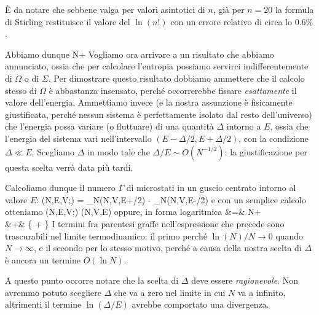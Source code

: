 \begin{Nota}
\`E da notare che sebbene valga per valori asintotici di $n$, già per $n=20$ la formula di Stirling restituisce il valore del $\ln(n!)$ con un errore relativo di circa lo $0.6\%$.
\end{Nota}

Abbiamo dunque
\be
\ln{} \simeq N\ln{} + 
\ee
Vogliamo ora arrivare a un risultato che abbiamo annunciato, ossia che per calcolare l'entropia possiamo servirci indifferentemente di $\Omega$ o di $\Sigma$. Per dimostrare questo risultato dobbiamo ammettere che il calcolo stesso di $\Omega$ è abbastanza insensato, perché occorrerebbe fissare {\em esattamente} il valore dell'energia. Ammettiamo invece (e la nostra assunzione è fisicamente giustificata, perché nessun sistema è perfettamente isolato dal resto dell'universo) che l'energia possa variare (o fluttuare) di una quantità $\Delta$ intorno a $E$, ossia che l'energia del sistema vari nell'intervallo $(E-\Delta/2,E+\Delta/2)$, con la condizione $\Delta \ll E$. Scegliamo $\Delta$ in modo tale che $\Delta/E \sim O(N^{-1/2})$: la giustificazione per questa scelta verrà data più tardi.

Calcoliamo dunque il numero $\Gamma$ di microstati in un guscio centrato intorno al valore $E$:
\be
\Gamma(N,E,V;\Delta) = \Sigma_{N}(N,V,E+\Delta/2) - \Sigma_{N}(N,V,E-\Delta/2) \simeq {}\Delta
\ee
e con un semplice calcolo otteniamo
\be
\Gamma(N,E,V;\Delta) \simeq {}\Sigma(N,V,E)
\ee
oppure, in forma logaritmica
\bea
{} &=& N\ln{} + \nonumber\\
  &+& \left\{ \ln{} + \ln{}\right\}
\eea
I termini fra parentesi graffe nell'espressione che precede sono trascurabili nel limite termodinamico: il primo perché $\ln(N)/N \to 0$ quando $N\to\infty$, e il secondo per lo stesso motivo, perché a causa della nostra scelta di $\Delta$ è ancora un termine $O(\ln N )$.

A questo punto occorre notare che la scelta di $\Delta$ deve essere {\em ragionevole}. Non avremmo potuto scegliere $\Delta$ che va a zero nel limite in cui $N$ va a infinito, altrimenti il termine $\ln(\Delta/E)$ avrebbe comportato una divergenza.

